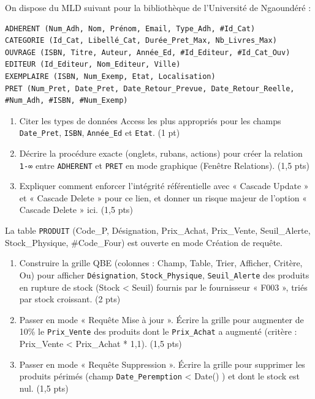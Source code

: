 \documentclass[11pt]{article}
\begin{document}
\begin{exercice}
On dispose du MLD suivant pour la bibliothèque de l'Université de Ngaoundéré :
\begin{verbatim}
ADHERENT (Num_Adh, Nom, Prénom, Email, Type_Adh, #Id_Cat)
CATEGORIE (Id_Cat, Libellé_Cat, Durée_Pret_Max, Nb_Livres_Max)
OUVRAGE (ISBN, Titre, Auteur, Année_Ed, #Id_Editeur, #Id_Cat_Ouv)
EDITEUR (Id_Editeur, Nom_Editeur, Ville)
EXEMPLAIRE (ISBN, Num_Exemp, Etat, Localisation)
PRET (Num_Pret, Date_Pret, Date_Retour_Prevue, Date_Retour_Reelle, #Num_Adh, #ISBN, #Num_Exemp)
\end{verbatim}
\begin{enumerate}
    \item Citer les types de données Access les plus appropriés pour les champs \texttt{Date\_Pret}, \texttt{ISBN}, \texttt{Année\_Ed} et \texttt{Etat}. (1 pt)
    \item Décrire la procédure exacte (onglets, rubans, actions) pour créer la relation \texttt{1-∞} entre \texttt{ADHERENT} et \texttt{PRET} en mode graphique (Fenêtre Relations). (1,5 pts)
    \item Expliquer comment enforcer l'intégrité référentielle avec « Cascade Update » et « Cascade Delete » pour ce lien, et donner un risque majeur de l'option « Cascade Delete » ici. (1,5 pts)
\end{enumerate}
\end{exercice}

\begin{exercice}
La table \texttt{PRODUIT} (Code\_P, Désignation, Prix\_Achat, Prix\_Vente, Seuil\_Alerte, Stock\_Physique, \#Code\_Four) est ouverte en mode Création de requête.
\begin{enumerate}
    \item Construire la grille QBE (colonnes : Champ, Table, Trier, Afficher, Critère, Ou) pour afficher \texttt{Désignation}, \texttt{Stock\_Physique}, \texttt{Seuil\_Alerte} des produits en rupture de stock (Stock < Seuil) fournis par le fournisseur « F003 », triés par stock croissant. (2 pts)
    \item Passer en mode « Requête Mise à jour ». Écrire la grille pour augmenter de 10\% le \texttt{Prix\_Vente} des produits dont le \texttt{Prix\_Achat} a augmenté (critère : Prix\_Vente < Prix\_Achat * 1,1). (1,5 pts)
    \item Passer en mode « Requête Suppression ». Écrire la grille pour supprimer les produits périmés (champ \texttt{Date\_Peremption} < Date() ) et dont le stock est nul. (1,5 pts)
\end{enumerate}
\end{exercice}
\end{document}
